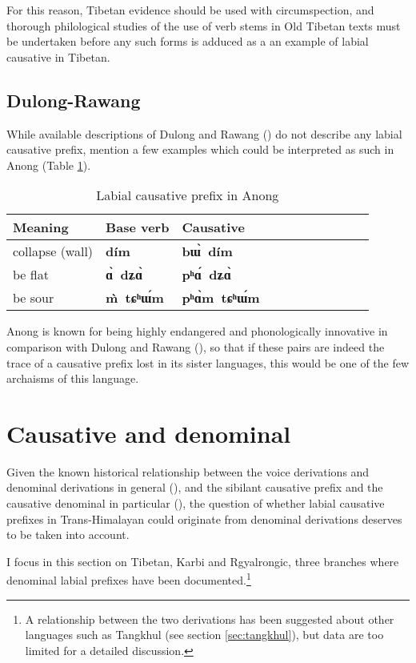 \documentclass[oneside,a4paper,11pt]{article}
\newcommand{\ipa}[1]{\textbf{{\phon\mbox{#1}}}} %
\begin{document}
For this reason, Tibetan evidence should be used with circumspection, and thorough philological studies of the use of verb stems in Old Tibetan texts must be undertaken before any such forms is adduced as a an example of labial causative in Tibetan.

\subsection{Dulong-Rawang}
While available descriptions of Dulong and Rawang (\citealt{sunhk82dulong, lapolla01valency}) do not describe any labial causative prefix, \citet[91]{sunhk05anong} mention a few examples which could be interpreted as  such in Anong (Table \ref{tab:anong}).

\begin{table}[H]
\caption{Labial causative prefix in Anong} \centering \label{tab:anong}
\begin{tabular}{lllllllllll}
\toprule
Meaning & Base verb& Causative \\
\midrule
collapse (wall) & 	\ipa{dím} & 	\ipa{bɯ̀ dím} \\ 
be flat & 	\ipa{ɑ̀ dʑɑ̀} & 	\ipa{pʰɑ́ dʑɑ̀} \\ 
be sour & 	\ipa{m̀ tɕʰɯ́m} & 	\ipa{pʰɑ̀m tɕʰɯ́m} \\ 
\bottomrule
\end{tabular}
\end{table}

Anong is known for being highly endangered and phonologically innovative in comparison with Dulong and Rawang (\citealt[133-152]{sunhk05anong}), so that if these pairs are indeed the trace of a causative prefix lost in its sister languages, this would be one of the few archaisms of this language. 


\section{Causative and denominal} \label{sec:denominal}
Given the known historical relationship between the voice derivations and denominal derivations in general (\citealt{jacques14antipassive}), and the sibilant causative prefix and the causative denominal in particular (\citealt{jacques15causative}), the question of whether labial causative prefixes in Trans-Himalayan could originate from denominal derivations deserves to be taken into account.

I focus in this section on Tibetan, Karbi and Rgyalrongic, three branches where denominal labial prefixes have been documented.\footnote{A relationship between the two derivations has been suggested about other languages such as Tangkhul (see section \ref{sec:tangkhul}), but data are too limited for a detailed discussion.  }
\end{document}
